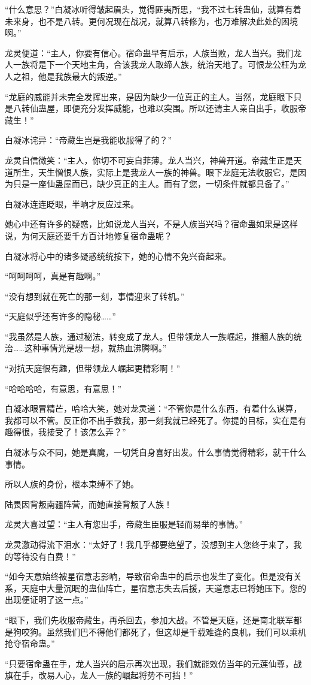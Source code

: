 \begin{this_body}
“什么意思？”白凝冰听得皱起眉头，觉得匪夷所思，“我不过七转蛊仙，就算有着未来身，也不是八转。更何况现在战况，就算八转修为，也万难解决此处的困境啊。”

龙灵便道：“主人，你要有信心。宿命蛊早有启示，人族当败，龙人当兴。我们龙人一族将是下一个天地主角，合该我龙人取缔人族，统治天地了。可恨龙公枉为龙人之祖，他是我族最大的叛逆。”

“龙庭的威能并未完全发挥出来，是因为缺少一位真正的主人。当然，龙庭眼下只是八转仙蛊屋，即便充分发挥威能，也难以突围。所以还请主人亲自出手，收服帝藏生！”

白凝冰诧异：“帝藏生岂是我能收服得了的？”

龙灵自信微笑：“主人，你切不可妄自菲薄。龙人当兴，神兽开道。帝藏生正是天道所生，天生憎恨人族，实际上是我龙人一族的神兽。眼下龙庭无法收服它，是因为只是一座仙蛊屋而已，缺少真正的主人。而有了您，一切条件就都具备了。”

白凝冰连连眨眼，半晌才反应过来。

她心中还有许多的疑惑，比如说龙人当兴，不是人族当兴吗？宿命蛊如果是这样说，为何天庭还要千方百计地修复宿命蛊呢？

白凝冰将心中的诸多疑惑统统按下，她的心情不免兴奋起来。

“呵呵呵呵，真是有趣啊。”

“没有想到就在死亡的那一刻，事情迎来了转机。”

“天庭似乎还有许多的隐秘……”

“我虽然是人族，通过秘法，转变成了龙人。但带领龙人一族崛起，推翻人族的统治……这种事情光是想一想，就热血沸腾啊。”

“对抗天庭很有趣，但带领龙人崛起更精彩啊！”

“哈哈哈哈，有意思，有意思！”

白凝冰眼冒精芒，哈哈大笑，她对龙灵道：“不管你是什么东西，有着什么谋算，我都可以不管。反正你不出手救我，那一刻我就已经死了。你提的目标，实在是有趣得很，我接受了！该怎么弄？”

白凝冰与众不同，她是真魔，一切凭自身喜好出发。什么事情觉得精彩，就干什么事情。

所以人族的身份，根本束缚不了她。

陆畏因背叛南疆阵营，而她直接背叛了人族！

龙灵大喜过望：“主人有您出手，帝藏生臣服是轻而易举的事情。”

龙灵激动得流下泪水：“太好了！我几乎都要绝望了，没想到主人您终于来了，我的等待没有白费！”

“如今天意始终被星宿意志影响，导致宿命蛊中的启示也发生了变化。但是没有关系，天庭中大量沉眠的蛊仙阵亡，星宿意志失去后援，天道意志已将她压下。您的出现便证明了这一点。”

“眼下，我们先收服帝藏生，再杀回去，参加大战。不管是天庭，还是南北联军都是狗咬狗。虽然我们巴不得他们都死了，但这却是千载难逢的良机，我们可以乘机抢夺宿命蛊。”

“只要宿命蛊在手，龙人当兴的启示再次出现，我们就能效仿当年的元莲仙尊，战旗在手，改易人心，龙人一族的崛起将势不可挡！”

\end{this_body}

